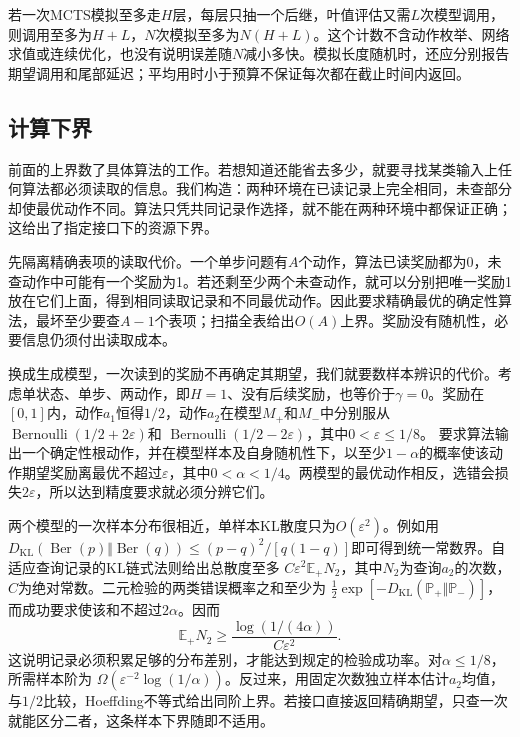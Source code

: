 若一次MCTS模拟至多走$H$层，每层只抽一个后继，叶值评估又需$L$次模型调用，则调用至多为$H+L$，$N$次模拟至多为$N(H+L)$。这个计数不含动作枚举、网络求值或连续优化，也没有说明误差随$N$减小多快。模拟长度随机时，还应分别报告期望调用和尾部延迟；平均用时小于预算不保证每次都在截止时间内返回。

\subsection{计算下界}
\label{sec:rl-planning-lower-bounds}

前面的上界数了具体算法的工作。若想知道还能省去多少，就要寻找某类输入上任何算法都必须读取的信息。我们构造：两种环境在已读记录上完全相同，未查部分却使最优动作不同。算法只凭共同记录作选择，就不能在两种环境中都保证正确；这给出了指定接口下的资源下界。

先隔离精确表项的读取代价。一个单步问题有$A$个动作，算法已读奖励都为0，未查动作中可能有一个奖励为1。若还剩至少两个未查动作，就可以分别把唯一奖励1放在它们上面，得到相同读取记录和不同最优动作。因此要求精确最优的确定性算法，最坏至少要查$A-1$个表项；扫描全表给出$O(A)$上界。奖励没有随机性，必要信息仍须付出读取成本。

换成生成模型，一次读到的奖励不再确定其期望，我们就要数样本辨识的代价。考虑单状态、单步、两动作，即$H=1$、没有后续奖励，也等价于$\gamma=0$。奖励在$[0,1]$内，动作$a_1$恒得$1/2$，动作$a_2$在模型$M_+$和$M_-$中分别服从
$\operatorname{Bernoulli}(1/2+2\varepsilon)$和
$\operatorname{Bernoulli}(1/2-2\varepsilon)$，其中$0<\varepsilon\leq1/8$。
要求算法输出一个确定性根动作，并在模型样本及自身随机性下，以至少$1-\alpha$的概率使该动作期望奖励离最优不超过$\varepsilon$，其中$0<\alpha<1/4$。两模型的最优动作相反，选错会损失$2\varepsilon$，所以达到精度要求就必须分辨它们。

两个模型的一次样本分布很相近，单样本KL散度只为$O(\varepsilon^2)$。例如用
$D_{\mathrm{KL}}(\operatorname{Ber}(p)\Vert\operatorname{Ber}(q))
\leq(p-q)^2/[q(1-q)]$即可得到统一常数界。自适应查询记录的KL链式法则给出总散度至多
$C\varepsilon^2\mathbb E_+N_2$，其中$N_2$为查询$a_2$的次数，$C$为绝对常数。二元检验的两类错误概率之和至少为
$\tfrac12\exp[-D_{\mathrm{KL}}(\mathbb P_+\Vert\mathbb P_-)]$，
而成功要求使该和不超过$2\alpha$。因而
\[
 \mathbb E_+N_2\geq
 \frac{\log(1/(4\alpha))}{C\varepsilon^2}.
\]
这说明记录必须积累足够的分布差别，才能达到规定的检验成功率。对$\alpha\leq1/8$，所需样本阶为
$\Omega(\varepsilon^{-2}\log(1/\alpha))$。反过来，用固定次数独立样本估计$a_2$均值，与$1/2$比较，Hoeffding不等式给出同阶上界。若接口直接返回精确期望，只查一次就能区分二者，这条样本下界随即不适用。

